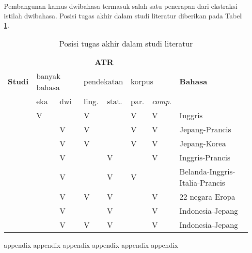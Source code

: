 \documentclass[../sections/lampiran.tex]{subfiles}
\begin{document}

Pembangunan kamus dwibahasa termasuk salah satu penerapan dari ekstraksi istilah dwibahasa. Posisi tugas akhir dalam studi literatur diberikan pada Tabel \ref{a:posisi_tugas_akhir}.
\begin{table}[htbp]
	\centering
	\caption{Posisi tugas akhir dalam studi literatur}
	\label{a:posisi_tugas_akhir}
	\begin{tabular}{p{} p{} p{} p{} p{} p{} p{} p{}}
		\hline
		\multirow{3}{*}{\centering\textbf{Studi}} & \multicolumn{6}{c}{\centering\textbf{ATR}} & \multirow{3}{*}{\centering\textbf{Bahasa}}\\
		\cline{2-7}
		{} & \multicolumn{2}{p{\tablewidth/5}}{\centering banyak bahasa} & \multicolumn{2}{p{\tablewidth/5}}{\centering pendekatan} & \multicolumn{2}{p{\tablewidth/5}}{\centering korpus} & {}\\
		\cline{2-7}
		{} & \centering eka & \centering dwi & \centering ling. & \centering stat. & \centering par. & \centering \textit{comp.} & {}\\
		\hline
		\hline
		\textcite{ananiadou} & V & {} & V & {} & V & V & Inggris\\ \hline
		\textcite{tsuji}     & {} & V & V & {} & V & V & Jepang-Prancis\\ \hline
		\textcite{fujii}     & {} & V & V & {} & V & V & Jepang-Korea\\ \hline
		\textcite{daille}    & {} & V & {} & V & {} & V & Inggris-Prancis\\ \hline
		\textcite{lefever}   & {} & V & {} & V & V & {} & Belanda-Inggris-Italia-Prancis\\ \hline
		\textcite{aker}      & {} & V & V & V & {} & V & 22 negara Eropa\\ \hline
		\textcite{limanthie} & {} & V & {} & V & {} & V & Indonesia-Jepang\\
		\hline
		\hline
		\textcite{tugas akhir} & \centering {} & V & V & V & {} & V & Indonesia-Jepang\\
		\hline
	\end{tabular}
\end{table}

appendix  appendix appendix appendix appendix appendix
\end{document}

